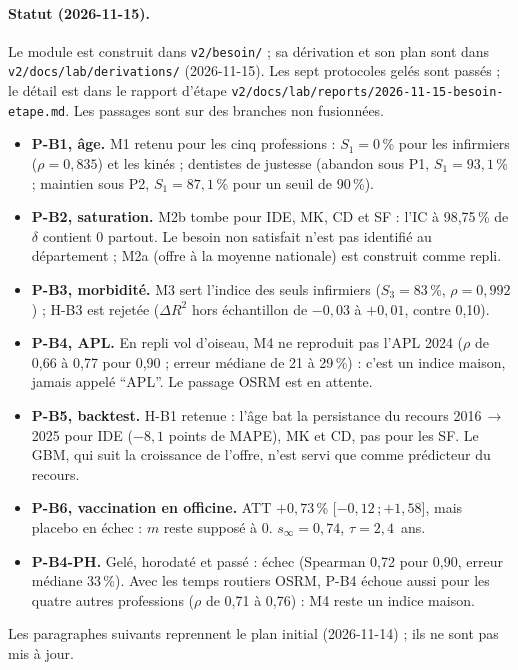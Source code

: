 \paragraph{Statut (2026-11-15).}
Le module est construit dans \texttt{v2/\allowbreak{}besoin/\allowbreak{}} ; sa dérivation et son plan sont dans \texttt{v2/\allowbreak{}docs/\allowbreak{}lab/\allowbreak{}derivations/\allowbreak{}} (2026-11-15).
Les sept protocoles gelés sont passés ; le détail est dans le rapport d'étape \texttt{v2/\allowbreak{}docs/\allowbreak{}lab/\allowbreak{}reports/\allowbreak{}2026-\allowbreak{}11-\allowbreak{}15-\allowbreak{}besoin-\allowbreak{}etape.md}. Les passages sont sur des branches non fusionnées.
\begin{itemize}
\item \textbf{P-B1, âge.} M1 retenu pour les cinq professions : $S_1=0$\mesure{}\,\% pour les infirmiers ($\rho=0{,}835$\mesure{}) et les kinés ; dentistes de justesse (abandon sous P1, $S_1=93{,}1$\mesure{}\,\% ; maintien sous P2, $S_1=87{,}1$\mesure{}\,\% pour un seuil de 90\suppose{}\,\%).
\item \textbf{P-B2, saturation.} M2b tombe pour IDE, MK, CD et SF : l'IC à 98,75\,\% de $\delta$ contient 0 partout. Le besoin non satisfait n'est pas identifié au département ; M2a (offre à la moyenne nationale) est construit comme repli.
\item \textbf{P-B3, morbidité.} M3 sert l'indice des seuls infirmiers ($S_3=83$\mesure{}\,\%, $\rho=0{,}992$\mesure{}) ; H-B3 est rejetée ($\Delta R^2$ hors échantillon de $-0{,}03$ à $+0{,}01$\mesure{}, contre 0,10\suppose{}).
\item \textbf{P-B4, APL.} En repli vol d'oiseau, M4 ne reproduit pas l'APL 2024 ($\rho$ de 0,66 à 0,77\mesure{} pour 0,90\suppose{} ; erreur médiane de 21 à 29\mesure{}\,\%) : c'est un indice maison, jamais appelé \enquote{APL}. Le passage OSRM est en attente.
\item \textbf{P-B5, backtest.} H-B1 retenue : l'âge bat la persistance du recours 2016\,$\to$\,2025 pour IDE ($-8{,}1$\mesure{} points de MAPE), MK et CD, pas pour les SF. Le GBM, qui suit la croissance de l'offre, n'est servi que comme prédicteur du recours.
\item \textbf{P-B6, vaccination en officine.} ATT $+0{,}73$\mesure{}\,\% [$-0{,}12$\,;\,$+1{,}58$], mais placebo en échec : $m$ reste supposé à 0. $s_\infty=0{,}74$\derive{}, $\tau=2{,}4$\derive{}~ans.
\item \textbf{P-B4-PH.} Gelé, horodaté et passé : échec (Spearman 0,72\mesure{} pour 0,90\suppose{}, erreur médiane 33\mesure{}\,\%). Avec les temps routiers OSRM, P-B4 échoue aussi pour les quatre autres professions ($\rho$ de 0,71 à 0,76\mesure{}) : M4 reste un indice maison.
\end{itemize}
Les paragraphes suivants reprennent le plan initial (2026-11-14) ; ils ne sont pas mis à jour.

